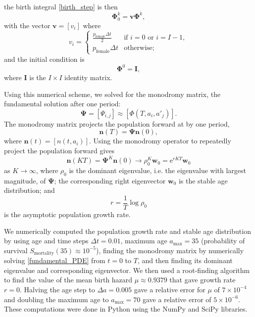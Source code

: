 \documentclass[12pt]{article}
\renewcommand{\vec}[1]{\mathbf{#1}}
\newcommand{\mat}[1]{\mathbf{#1}}
\newcommand{\me}{\mathrm{e}}
\begin{document}
the birth integral \eqref{birth_step} is then
\begin{equation}
  \mat{\Phi}_0^k = \vec{v} \mat{\Phi}^k,
\end{equation}
with the vector $\vec{v} = [v_i]$ where
\begin{equation}
  v_i =
  \begin{cases}
    \frac{p_{\text{female}} \Delta t}{2}
    & \text{if $i = 0$ or $i = I - 1$}, \\
    p_{\text{female}} \Delta t
    & \text{otherwise};
  \end{cases}
\end{equation}
and the initial condition is
\begin{equation}
  \mat{\Phi}^0 = \mat{I},
\end{equation}
where $\mat{I}$ is the $I \times I$ identity matrix.

Using this numerical scheme, we solved for the monodromy matrix, the
fundamental solution after one period:
\begin{equation}
  \mat{\Psi} = [\Psi_{i, j}] \approx [\Phi(T, a_i, a'_j)].
\end{equation}
The monodromy matrix projects the population forward at by one period,
\begin{equation}
  \vec{n}(T) = \mat{\Psi} \vec{n}(0),
\end{equation}
where $\vec{n}(t) = [n(t, a_i)]$.
Using the monodromy operator to repeatedly project the population
forward gives
\begin{equation}
  \vec{n}(K T)
  = \mat{\Psi}^K \vec{n}(0)
  \to \rho_0^K \vec{w}_0
  = \me^{r K T} \vec{w}_0
\end{equation}
as $K \to \infty$,
where $\rho_0$ is the dominant eigenvalue, i.e. the eigenvalue with
largest magnitude, of $\mat{\Psi}$;
the corresponding right eigenvector $\vec{w}_0$ is the stable age
distribution; and
\begin{equation}
  r = \frac{1}{T} \log \rho_0
\end{equation}
is the asymptotic population growth rate.

We numerically computed the population growth rate and stable age
distribution by using age and time steps $\Delta t = 0.01$,
maximum age $a_{\text{max}} = 35$
(probability of survival
$S_{\text{mortality}}(35) \approx 10^{-5}$),
finding the monodromy matrix by numerically solving
\eqref{fundamental_PDE} from $t = 0$ to $T$, and
then finding its dominant eigenvalue and corresponding eigenvector.
We then used a root-finding algorithm to find the value of the mean
birth hazard $\mu \approx 0.9379$ that gave growth rate $r = 0$.
Halving the age step to $\Delta a = 0.005$
gave a relative error for $\mu$ of $7 \times 10^{-4}$
and doubling the maximum age to $a_{\text{max}} = 70$
gave a relative error of $5 \times 10^{-6}$.
These computations were done in Python \autocite{python} using the
NumPy \autocite{numpy} and SciPy \autocite{scipy} libraries.
\end{document}
